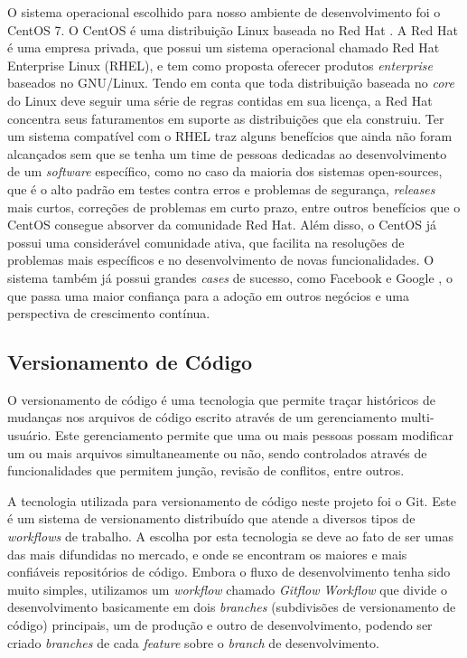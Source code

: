 O sistema operacional escolhido para nosso ambiente de desenvolvimento foi o CentOS 7. O CentOS é uma distribuição Linux baseada no Red Hat \cite{centos-redhat-based}. A Red Hat é uma empresa privada, que possui um sistema operacional chamado Red Hat Enterprise Linux (RHEL), e tem como proposta oferecer produtos \textit{enterprise} baseados no GNU/Linux. Tendo em conta que toda distribuição baseada no \textit{core} do Linux deve seguir uma série de regras contidas em sua licença, a Red Hat concentra seus faturamentos em suporte as distribuições que ela construiu. Ter um sistema compatível com o RHEL traz alguns benefícios que ainda não foram alcançados sem que se tenha um time de pessoas dedicadas ao desenvolvimento de um \textit{software} específico, como no caso da maioria dos sistemas open-sources, que é o alto padrão em testes contra erros e problemas de segurança, \textit{releases} mais curtos, correções de problemas em curto prazo, entre outros benefícios que o CentOS consegue absorver da comunidade Red Hat. Além disso, o CentOS já possui uma considerável comunidade ativa, que facilita na resoluções de problemas mais específicos e no desenvolvimento de novas funcionalidades. O sistema também já possui grandes \textit{cases} de sucesso, como Facebook \cite{facebook-distro} e Google \cite{google-redhat}, o que passa uma maior confiança para a adoção em outros negócios e uma perspectiva de crescimento contínua.

\subsection{Versionamento de Código}
O versionamento de código é uma tecnologia que permite traçar históricos de mudanças nos arquivos de código escrito através de um gerenciamento multi-usuário. Este gerenciamento permite que uma ou mais pessoas possam modificar um ou mais arquivos simultaneamente ou não, sendo controlados através de funcionalidades que permitem junção, revisão de conflitos, entre outros.

A tecnologia utilizada para versionamento de código neste projeto foi o Git. Este é um sistema de versionamento distribuído que atende a diversos tipos de \textit{workflows} de trabalho. A escolha por esta tecnologia se deve ao fato de ser umas das mais difundidas no mercado, e onde se encontram os maiores e mais confiáveis repositórios de código. Embora o fluxo de desenvolvimento tenha sido muito simples, utilizamos um \textit{workflow} chamado \textit{Gitflow Workflow} \cite{gitflow} que divide o desenvolvimento basicamente em dois \textit{branches} (subdivisões de versionamento de código) principais, um de produção e outro de desenvolvimento, podendo ser criado \textit{branches} de cada \textit{feature} sobre o \textit{branch} de desenvolvimento. 


